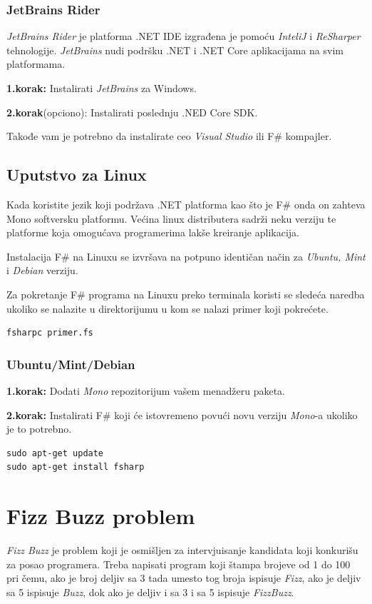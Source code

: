 \documentclass[a4paper]{article}
\begin{document}
\subsubsection{JetBrains Rider}

{\em JetBrains Rider} je platforma .NET IDE izgrađena je pomoću {\em InteliJ} i {\em ReSharper} tehnologije. {\em JetBrains} nudi podršku .NET i .NET Core aplikacijama na svim platformama.

\textbf{1.korak:} Instalirati {\em JetBrains} za Windows.

\textbf{2.korak}(opciono): Instalirati poslednju .NED Core SDK.

Takođe vam je potrebno da instalirate ceo {\em Visual Studio} ili F\# kompajler.


\subsection{Uputstvo za Linux}

Kada koristite jezik koji podržava .NET platforma kao što je F\# onda on zahteva Mono\cite{mono} softversku platformu. Većina linux distributera sadrži neku verziju te platforme koja omogućava programerima lakše kreiranje aplikacija. 

Instalacija F\# na Linuxu se izvršava na potpuno identičan način za {\em Ubuntu, Mint} i {\em Debian} verziju.

Za pokretanje F\# programa na Linuxu preko terminala koristi se sledeća naredba ukoliko se nalazite u direktorijumu u kom se nalazi primer koji pokrećete.
\\
\begin{lstlisting}
fsharpc primer.fs
\end{lstlisting}

\subsubsection{Ubuntu/Mint/Debian}

\textbf{1.korak:} Dodati {\em Mono}\cite{mono} repozitorijum vašem menadžeru paketa.

\textbf{2.korak:} Instalirati F\# koji će istovremeno povući novu verziju {\em Mono}-a ukoliko je to potrebno.
\\
\begin{lstlisting}
sudo apt-get update
sudo apt-get install fsharp
\end{lstlisting}
 
\section{Fizz Buzz problem}
\textit{Fizz Buzz} je problem koji je osmišljen za intervjuisanje kandidata koji konkurišu za posao programera. Treba napisati program koji štampa brojeve od 1 do 100 pri čemu, ako je broj deljiv sa 3 tada umesto tog broja ispisuje \textit{Fizz}, ako je deljiv sa 5 ispisuje \textit{Buzz}, dok ako je deljiv i sa 3 i sa 5 ispisuje \textit{FizzBuzz}.
\end{document}
